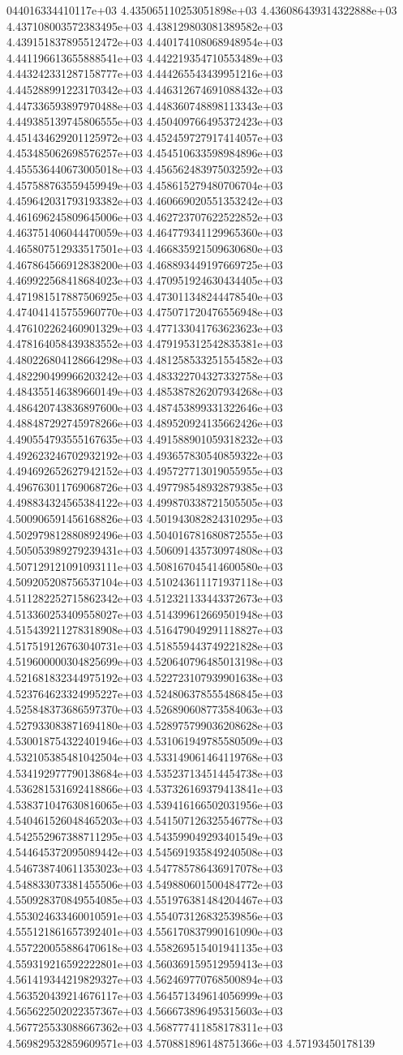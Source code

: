 044016334410117e+03	4.435065110253051898e+03	4.436086439314322888e+03	4.437108003572383495e+03	4.438129803081389582e+03	4.439151837895512472e+03	4.440174108068948954e+03	4.441196613655888541e+03	4.442219354710553489e+03	4.443242331287158777e+03	4.444265543439951216e+03	4.445288991223170342e+03	4.446312674691088432e+03	4.447336593897970488e+03	4.448360748898113343e+03	4.449385139745806555e+03	4.450409766495372423e+03	4.451434629201125972e+03	4.452459727917414057e+03	4.453485062698576257e+03	4.454510633598984896e+03	4.455536440673005018e+03	4.456562483975032592e+03	4.457588763559459949e+03	4.458615279480706704e+03	4.459642031793193382e+03	4.460669020551353242e+03	4.461696245809645006e+03	4.462723707622522852e+03	4.463751406044470059e+03	4.464779341129965360e+03	4.465807512933517501e+03	4.466835921509630680e+03	4.467864566912838200e+03	4.468893449197669725e+03	4.469922568418684023e+03	4.470951924630434405e+03	4.471981517887506925e+03	4.473011348244478540e+03	4.474041415755960770e+03	4.475071720476556948e+03	4.476102262460901329e+03	4.477133041763623623e+03	4.478164058439383552e+03	4.479195312542835381e+03	4.480226804128664298e+03	4.481258533251554582e+03	4.482290499966203242e+03	4.483322704327332758e+03	4.484355146389660149e+03	4.485387826207934268e+03	4.486420743836897600e+03	4.487453899331322646e+03	4.488487292745978266e+03	4.489520924135662426e+03	4.490554793555167635e+03	4.491588901059318232e+03	4.492623246702932192e+03	4.493657830540859322e+03	4.494692652627942152e+03	4.495727713019055955e+03	4.496763011769068726e+03	4.497798548932879385e+03	4.498834324565384122e+03	4.499870338721505505e+03	4.500906591456168826e+03	4.501943082824310295e+03	4.502979812880892496e+03	4.504016781680872555e+03	4.505053989279239431e+03	4.506091435730974808e+03	4.507129121091093111e+03	4.508167045414600580e+03	4.509205208756537104e+03	4.510243611171937118e+03	4.511282252715862342e+03	4.512321133443372673e+03	4.513360253409558027e+03	4.514399612669501948e+03	4.515439211278318908e+03	4.516479049291118827e+03	4.517519126763040731e+03	4.518559443749221828e+03	4.519600000304825699e+03	4.520640796485013198e+03	4.521681832344975192e+03	4.522723107939901638e+03	4.523764623324995227e+03	4.524806378555486845e+03	4.525848373686597370e+03	4.526890608773584063e+03	4.527933083871694180e+03	4.528975799036208628e+03	4.530018754322401946e+03	4.531061949785580509e+03	4.532105385481042504e+03	4.533149061464119768e+03	4.534192977790138684e+03	4.535237134514454738e+03	4.536281531692418866e+03	4.537326169379413841e+03	4.538371047630816065e+03	4.539416166502031956e+03	4.540461526048465203e+03	4.541507126325546778e+03	4.542552967388711295e+03	4.543599049293401549e+03	4.544645372095089442e+03	4.545691935849240508e+03	4.546738740611353023e+03	4.547785786436917078e+03	4.548833073381455506e+03	4.549880601500484772e+03	4.550928370849554085e+03	4.551976381484204467e+03	4.553024633460010591e+03	4.554073126832539856e+03	4.555121861657392401e+03	4.556170837990161090e+03	4.557220055886470618e+03	4.558269515401941135e+03	4.559319216592222801e+03	4.560369159512959413e+03	4.561419344219829327e+03	4.562469770768500894e+03	4.563520439214676117e+03	4.564571349614056999e+03	4.565622502022357367e+03	4.566673896495315603e+03	4.567725533088667362e+03	4.568777411858178311e+03	4.569829532859609571e+03	4.570881896148751366e+03	4.57193450178139